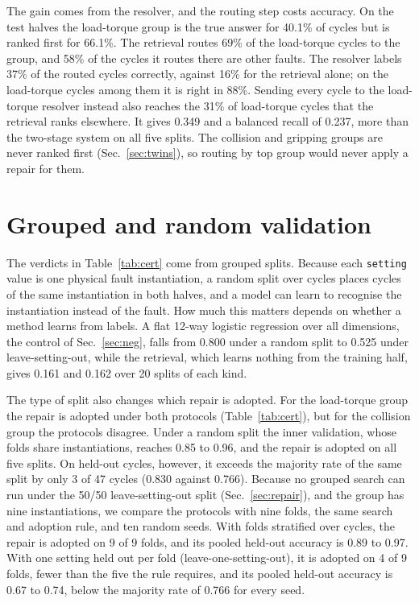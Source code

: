 \documentclass{ifacconf}
\begin{document}
The gain comes from the resolver, and the routing step costs accuracy. On the
test halves the load-torque group is the true answer for 40.1\% of cycles but is
ranked first for 66.1\%. The retrieval routes 69\% of the load-torque cycles to
the group, and 58\% of the cycles it routes there are other faults. The resolver
labels 37\% of the routed cycles correctly, against 16\% for the retrieval
alone; on the load-torque cycles among them it is right in 88\%. Sending every
cycle to the load-torque resolver instead also reaches the 31\% of load-torque
cycles that the retrieval ranks elsewhere. It gives 0.349 and a balanced recall
of 0.237, more than the two-stage system on all five splits. The collision and
gripping groups are never ranked first (Sec.~\ref{sec:twins}), so routing by top
group would never apply a repair for them.

\section{Grouped and random validation}
\label{sec:protocol}

The verdicts in Table~\ref{tab:cert} come from grouped splits. Because each
\texttt{setting} value is one physical fault instantiation, a random split over
cycles places cycles of the same instantiation in both halves, and a model can
learn to recognise the instantiation instead of the fault. How much this matters
depends on whether a method learns from labels. A flat 12-way logistic
regression over all dimensions, the control of Sec.~\ref{sec:neg}, falls from
0.800 under a random split to 0.525 under leave-setting-out, while the
retrieval, which learns nothing from the training half, gives 0.161 and 0.162
over 20 splits of each kind.

The type of split also changes which repair is adopted. For the load-torque
group the repair is adopted under both protocols (Table~\ref{tab:cert}), but for
the collision group the protocols disagree. Under a random split the inner
validation, whose folds share instantiations, reaches 0.85 to 0.96, and the
repair is adopted on all five splits. On held-out cycles, however, it exceeds
the majority rate of the same split by only 3 of 47 cycles (0.830 against
0.766). Because no grouped search can run under the 50/50 leave-setting-out split
(Sec.~\ref{sec:repair}), and the group has nine instantiations, we compare the
protocols with nine folds, the same search and adoption rule, and ten random
seeds. With folds stratified over cycles, the repair is adopted on 9 of 9 folds,
and its pooled held-out accuracy is 0.89 to 0.97. With one setting held out per
fold (leave-one-setting-out), it is adopted on 4 of 9 folds, fewer than the five
the rule requires, and its pooled held-out accuracy is 0.67 to 0.74, below the
majority rate of 0.766 for every seed.
\end{document}
